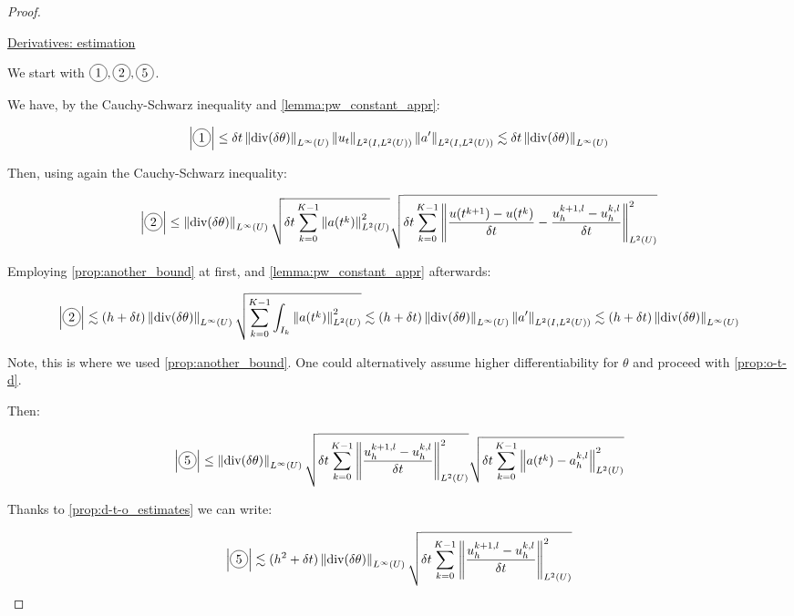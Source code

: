 \documentclass[english,a4paper,10pt,oneside]{scrbook}	%
\theoremstyle{break}
\newenvironment{mproof}[1][\proofname]{%
  \begin{proof}[#1]$ $\par\nobreak\ignorespaces
}{%
  \end{proof}
}
\renewcommand*{\proofname}{Proof}
\theoremstyle{remark}
\newcommand{\norm}[1]{\left\lVert#1\right\rVert}
\newcommand{\te}{\theta}
\newcommand{\dive}{\text{div}}
\newcommand*\circled[1]{\tikz[baseline=(char.base)]{
            \node[shape=circle,draw,inner sep=2pt] (char) {#1};}}
\begin{document}
\begin{mproof}
\underline{Derivatives: estimation}

We start with $\circled{1},\circled{2},\circled{5}$.

We have, by the Cauchy-Schwarz inequality and \cref{lemma:pw_constant_appr}:

\begin{align*}
\left |\circled{1}\right|\leq \delta t \norm{\dive(\delta \te)}_{L^\infty(U)}\norm{u_t}_{L^2(I,L^2(U))}\norm{a'}_{L^2(I,L^2(U))}\lesssim \delta t \norm{\dive(\delta \te)}_{L^\infty(U)}
\end{align*}

Then, using again the Cauchy-Schwarz inequality:

\begin{align*}
\left |\circled{2}\right|\leq \norm{\dive(\delta \te)}_{L^\infty(U)} \sqrt{\delta t \sum_{k=0}^{K-1} \norm{a(t^k)}^2_{L^2(U)}}\sqrt{\delta t \sum_{k=0}^{K-1} \norm{\frac{u(t^{k+1})-u(t^k)}{\delta t} - \frac{u_h^{k+1,l}-u_h^{k, l}}{\delta t}}_{L^2(U)}^2}
\end{align*}

Employing \cref{prop:another_bound} at first, and \cref{lemma:pw_constant_appr} afterwards:

\begin{align*}
\left |\circled{2}\right|\lesssim (h+\delta t) \norm{\dive(\delta \te)}_{L^\infty(U)} \sqrt{\sum_{k=0}^{K-1} \int_{I_k}\norm{a(t^k)}^2_{L^2(U)}}\lesssim (h+\delta t) \norm{\dive(\delta \te)}_{L^\infty(U)} \norm{a'}_{L^2(I,L^2(U))}\lesssim  (h+\delta t) \norm{\dive(\delta \te)}_{L^\infty(U)}
\end{align*}

Note, this is where we used \cref{prop:another_bound}. One could alternatively assume higher differentiability for $\theta$ and proceed with \cref{prop:o-t-d}.

Then:

\begin{align*}
	\left |\circled{5}\right|\leq  \norm{\dive(\delta \te)}_{L^\infty(U)} \sqrt{\delta t\sum_{k=0}^{K-1} \norm{\frac{u_h^{k+1,l}-u_h^{k, l}}{\delta t}}_{L^2(U)}^2}\sqrt{\delta t\sum_{k=0}^{K-1} \norm{a(t^{k})-a_h^{k,l}}_{L^2(U)}^2}
\end{align*}

Thanks to \cref{prop:d-t-o_estimates} we can write:

\begin{align*}
	\left |\circled{5}\right|\lesssim (h^2+\delta t)  \norm{\dive(\delta \te)}_{L^\infty(U)} \sqrt{\delta t\sum_{k=0}^{K-1} \norm{\frac{u_h^{k+1,l}-u_h^{k, l}}{\delta t}}_{L^2(U)}^2}
\end{align*}


\end{mproof}
\end{document}
